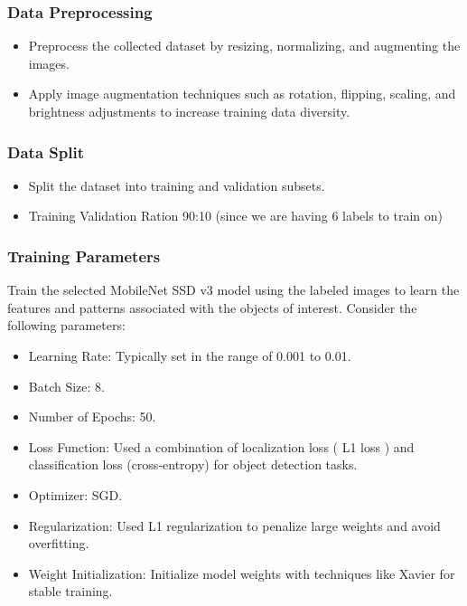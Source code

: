 \documentclass[a4paper,12pt,oneside]{book}
\begin{document}
\subsubsection{Data Preprocessing}
\begin{itemize}
    \item Preprocess the collected dataset by resizing, normalizing, and augmenting the images.
    \item Apply image augmentation techniques such as rotation, flipping, scaling, and brightness adjustments to increase training data diversity.
\end{itemize}

\subsubsection{Data Split}
\begin{itemize}
    \item Split the dataset into training and validation subsets.
    \item Training Validation Ration 90:10 (since we are having 6 labels to train on)
\end{itemize}

\subsubsection{Training Parameters}
Train the selected MobileNet SSD v3 model using the labeled images to learn the features and patterns associated with the objects of interest. Consider the following parameters:
\begin{itemize}
    \item Learning Rate: Typically set in the range of 0.001 to 0.01.
    \item Batch Size: 8.
    \item Number of Epochs: 50.
    \item Loss Function: Used a combination of localization loss ( L1 loss ) and classification loss (cross-entropy) for object detection tasks.
    \item Optimizer: SGD.
    \item Regularization: Used L1 regularization to penalize large weights and avoid overfitting.
    \item Weight Initialization: Initialize model weights with techniques like Xavier for stable training.

\end{itemize}
\end{document}
